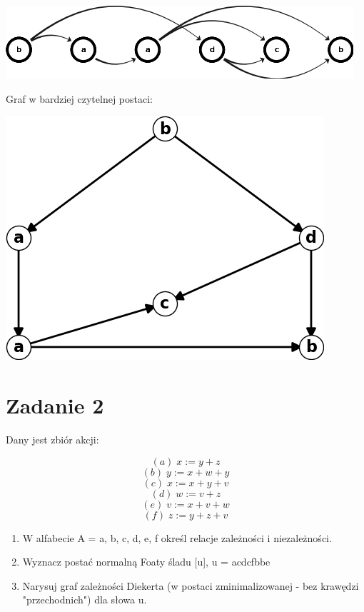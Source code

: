 \documentclass[12pt]{article}
\begin{document}
\begin{center}
\centering
    \includegraphics{graph1_reduced.png}
\end{center}

\newpage
\noindent
Graf w bardziej czytelnej postaci:
\begin{center}
\centering
    \includegraphics[scale=0.6]{graph1_reduced_pretty.png}
\end{center}

\section{Zadanie 2}
Dany jest zbiór akcji:

\[ (a)\;x := y + z \]
\[ (b)\;y := x + w + y \]
\[ (c)\;x := x + y + v \]
\[ (d)\;w := v + z \]
\[ (e)\;v := x + v + w \]
\[ (f)\;z := y + z + v \]

\begin{enumerate}[label=\alph*)]
    \item W alfabecie A = { a, b, c, d, e, f} określ relacje zależności i niezależności.
    \item Wyznacz postać normalną Foaty śladu [u], u = acdcfbbe
    \item Narysuj graf zależności Diekerta (w postaci zminimalizowanej - bez krawędzi "przechodnich") dla słowa u.
\end{enumerate} 
\end{document}
